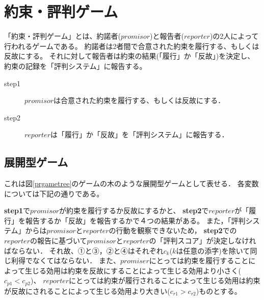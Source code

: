 \section{約束・評判ゲーム}
\label{promiseReputationGame}
「約束・評判ゲーム」とは、約諾者($promisor$)と報告者($reporter$)の2人によって行われるゲームである。
約諾者は2者間で合意された約束を履行する、もしくは反故にする。
それに対して報告者は約束の結果(「履行」か「反故」)を決定し、約束の記録を「評判システム」に報告する。

\begin{description}
  \item[step1]  $promisor$は合意された約束を履行する、もしくは反故にする．
  \item[step2]  $reporter$は「履行」か「反故」を「評判システム」に報告する．
\end{description}


\subsection{展開型ゲーム}
\label{prgame-by-extensive-form}

これは図\ref{prgametree}のゲームの木のような展開型ゲームとして表せる．
各変数については下記の通りである。

\textbf{step1}で$promisor$が約束を履行するか反故にするかと、
\textbf{step2}で$reporter$が「履行」を報告するか「反故」を報告するかで４つの結果がある。
また，「評判システム」からは$promisor$と$reporter$の行動を観察できないため，
\textbf{step2}での$reporter$の報告に基づいて$promisor$と$reporter$の「評判スコア」が決定しなければならない．
それ故、①と③，②と④はそれぞれ$c_k$($k$は任意の添字)を除いて同じ利得でなくてはならない．
また、$promiser$にとっては約束を履行することによって生じる効用は約束を反故にすることによって生じる効用より小さく($c_{p1} < c_{p2}$)、
$reporter$にとっては約束が履行されることによって生じる効用は約束が反故にされることによって生じる効用より大きい($c_{r1} > c_{r2}$)ものとする。


